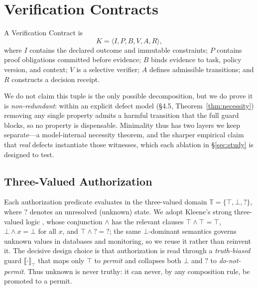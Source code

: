 \documentclass[sigconf,anonymous,review]{acmart}
\begin{document}
\section{Verification Contracts}
A Verification Contract is
\begin{equation}
K=\langle I,P,B,V,A,R\rangle,
\end{equation}
where $I$ contains the declared outcome and immutable constraints; $P$ contains proof obligations committed before evidence; $B$ binds evidence to task, policy version, and context; $V$ is a selective verifier; $A$ defines admissible transitions; and $R$ constructs a decision receipt.

We do not claim this tuple is the only possible decomposition, but we do prove it is \emph{non-redundant}: within an explicit defect model (\S4.5, Theorem~\ref{thm:necessity}) removing any single property admits a harmful transition that the full guard blocks, so no property is dispensable. Minimality thus has two layers we keep separate---a model-internal necessity theorem, and the sharper empirical claim that \emph{real} defects instantiate those witnesses, which each ablation in \S\ref{sec:study} is designed to test.

\subsection{Three-Valued Authorization}
Each authorization predicate evaluates in the three-valued domain $\mathbb{T}=\{\top,\bot,?\}$, where $?$ denotes an unresolved (unknown) state. We adopt Kleene's strong three-valued logic \cite{kleene1952metamathematics,fitting1994kleene}, whose conjunction $\land$ has the relevant clauses $\top\land\top=\top$, $\bot\land x=\bot$ for all $x$, and $\top\land{?}={?}$; the same $\bot$-dominant semantics governs unknown values in databases and monitoring, so we reuse it rather than reinvent it. The decisive design choice is that authorization is read through a \emph{truth-biased} guard $\llbracket\cdot\rrbracket_\top$ that maps only $\top$ to \emph{permit} and collapses both $\bot$ and $?$ to \emph{do-not-permit}. Thus unknown is never truthy: it can never, by any composition rule, be promoted to a permit.
\end{document}
